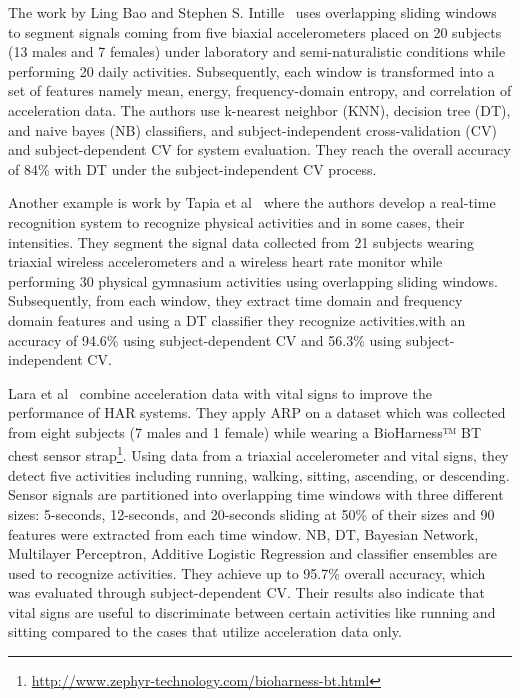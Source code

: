 The work by Ling Bao and Stephen S. Intille~\cite{bao2004activity} uses overlapping sliding windows to segment signals coming from five biaxial accelerometers placed on 20 subjects (13 males and 7 females) under laboratory and semi-naturalistic conditions while performing 20 daily activities. Subsequently, each window is transformed into a set of features namely mean, energy,  frequency-domain entropy, and correlation of acceleration data. The authors use k-nearest neighbor (KNN), decision tree (DT), and naive bayes (NB) classifiers, and subject-independent cross-validation (CV) and subject-dependent CV for system evaluation. They reach the overall accuracy of 84\% with DT under the subject-independent CV process.

Another example is work by Tapia et al~\cite{tapia2007real} where the authors develop a real-time recognition system to recognize physical activities and in some cases, their intensities. They segment the signal data collected from 21 subjects wearing triaxial wireless accelerometers and a wireless heart rate monitor while performing 30 physical gymnasium activities using overlapping sliding windows. Subsequently, from each window, they extract time domain and frequency domain features and using a DT classifier they recognize activities.with an accuracy of 94.6\% using
subject-dependent CV and 56.3\% using subject-independent CV. 

Lara et al~\cite{lara2012centinela} combine acceleration data with vital signs to improve the performance of HAR systems. They apply ARP on a dataset which was collected from eight subjects (7 males and 1 female) while wearing a BioHarness™ BT chest sensor strap\footnote{\url{http://www.zephyr-technology.com/bioharness-bt.html}}. Using data from a triaxial accelerometer and vital signs, they detect five activities including running, walking, sitting, ascending, or descending. Sensor signals are partitioned into overlapping time windows with three different sizes: 5-seconds, 12-seconds, and 20-seconds sliding at 50\% of their sizes and 90 features were extracted from each time window. NB, DT, Bayesian Network, Multilayer Perceptron, Additive Logistic Regression and classifier ensembles are used to recognize activities. They achieve up to 95.7\% overall accuracy, which was evaluated through subject-dependent CV. Their results also indicate that vital signs are useful to discriminate between certain activities like running and sitting compared to the cases that utilize acceleration data only.


